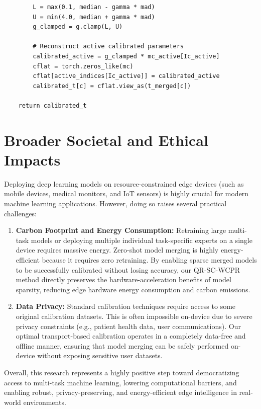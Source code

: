 \documentclass{article}
\theoremstyle{plain}
\theoremstyle{definition}
\theoremstyle{remark}
\begin{document}
\begin{verbatim}
        L = max(0.1, median - gamma * mad)
        U = min(4.0, median + gamma * mad)
        g_clamped = g.clamp(L, U)
        
        # Reconstruct active calibrated parameters
        calibrated_active = g_clamped * mc_active[Ic_active]
        cflat = torch.zeros_like(mc)
        cflat[active_indices[Ic_active]] = calibrated_active
        calibrated_t[c] = cflat.view_as(t_merged[c])
        
    return calibrated_t
\end{verbatim}
\label{alg:pytorch_code}

\section{Broader Societal and Ethical Impacts}
\label{app:impacts}

Deploying deep learning models on resource-constrained edge devices (such as mobile devices, medical monitors, and IoT sensors) is highly crucial for modern machine learning applications. However, doing so raises several practical challenges:
\begin{enumerate}
    \item \textbf{Carbon Footprint and Energy Consumption:} Retraining large multi-task models or deploying multiple individual task-specific experts on a single device requires massive energy. Zero-shot model merging is highly energy-efficient because it requires zero retraining. By enabling sparse merged models to be successfully calibrated without losing accuracy, our QR-SC-WCPR method directly preserves the hardware-acceleration benefits of model sparsity, reducing edge hardware energy consumption and carbon emissions.
    \item \textbf{Data Privacy:} Standard calibration techniques require access to some original calibration datasets. This is often impossible on-device due to severe privacy constraints (e.g., patient health data, user communications). Our optimal transport-based calibration operates in a completely data-free and offline manner, ensuring that model merging can be safely performed on-device without exposing sensitive user datasets.
\end{enumerate}

Overall, this research represents a highly positive step toward democratizing access to multi-task machine learning, lowering computational barriers, and enabling robust, privacy-preserving, and energy-efficient edge intelligence in real-world environments.
\end{document}
